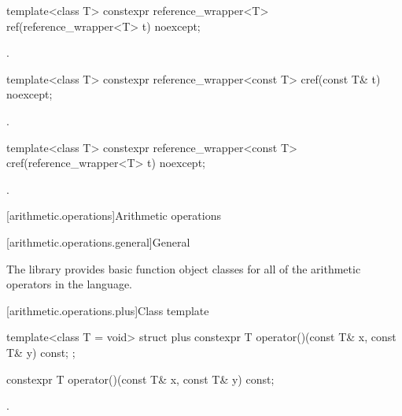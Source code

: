 %
\begin{itemdecl}
template<class T> constexpr reference_wrapper<T> ref(reference_wrapper<T> t) noexcept;
\end{itemdecl}

\begin{itemdescr}
\pnum
\returns
{}.
\end{itemdescr}

%
\begin{itemdecl}
template<class T> constexpr reference_wrapper<const T> cref(const T& t) noexcept;
\end{itemdecl}

\begin{itemdescr}
\pnum
\returns
{}.
\end{itemdescr}

%
\begin{itemdecl}
template<class T> constexpr reference_wrapper<const T> cref(reference_wrapper<T> t) noexcept;
\end{itemdecl}

\begin{itemdescr}
\pnum
\returns
{}.
\end{itemdescr}

[arithmetic.operations]{Arithmetic operations}

[arithmetic.operations.general]{General}

\pnum
The library provides basic function object classes for all of the arithmetic
operators in the language.

[arithmetic.operations.plus]{Class template }

%
\begin{itemdecl}
template<class T = void> struct plus {
  constexpr T operator()(const T& x, const T& y) const;
};
\end{itemdecl}

%
\begin{itemdecl}
constexpr T operator()(const T& x, const T& y) const;
\end{itemdecl}

\begin{itemdescr}
\pnum
\returns
{}.
\end{itemdescr}

